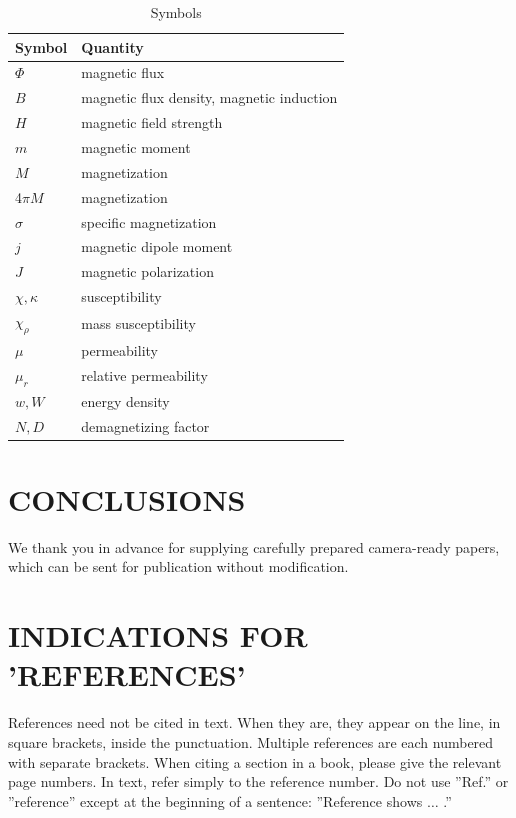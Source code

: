 \documentclass{ieeeijc}
\begin{document}
\begin{table}
\caption{Symbols}
\label{table}
\setlength{\tabcolsep}{32pt}
\begin{tabular}{|p{20pt}|p{80pt}|}
\hline
\textbf{Symbol}& 
\textbf{Quantity}\\

\hline
$\Phi $& 
magnetic flux\\
\hline
$B$& 
magnetic flux density, magnetic induction\\
\hline
$H$& 
magnetic field strength\\
\hline
$m$& 
magnetic moment\\
\hline
$M$& 
magnetization\\
\hline
4$\pi M$& 
magnetization\\
\hline
$\sigma $& 
specific magnetization\\
\hline
$j$& 
magnetic dipole moment\\
\hline
$J$& 
magnetic polarization\\
\hline
$\chi , \kappa $& 
susceptibility\\
\hline
$\chi_{\rho }$& 
mass susceptibility\\
\hline
$\mu $& 
permeability\\
\hline
$\mu_{r}$& 
relative permeability\\
\hline
$w, W$& 
energy density\\
\hline
$N, D$& 
demagnetizing factor\\

\hline
\end{tabular}
\label{tab1}
\end{table}

\section{CONCLUSIONS}
We thank you in advance for supplying carefully prepared camera-ready papers, which can be sent for publication without modification.

\section{INDICATIONS FOR 'REFERENCES'}
References need not be cited in text. When they are, they appear on the line, in square brackets, inside the punctuation. Multiple references are each numbered with separate brackets. When citing a section in a book, please give the relevant page numbers. In text, refer simply to the reference number. Do not use ''Ref.'' or ''reference'' except at the beginning of a sentence: ''Reference \cite{Fallah_2019} shows $\ldots$ .'' 
\end{document}
